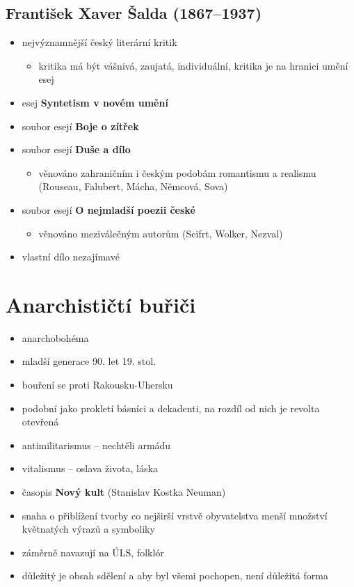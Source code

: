 \subsection{František Xaver Šalda (1867--1937)}
\begin{itemize}
\item nejvýznamnější český literární kritik
	\begin{itemize}
	\item kritika má být vášnivá, zaujatá, individuální, kritika je na hranici umění \ra esej
	\end{itemize}

\item esej \textbf{Syntetism v novém umění}
\item soubor esejí \textbf{Boje o zítřek}
\item soubor esejí \textbf{Duše a dílo}
	\begin{itemize}
	\item věnováno zahraničním i českým podobám romantismu a realismu (Rouseau, Falubert, Mácha, Němcová, Sova)
	\end{itemize}
\item soubor esejí \textbf{O nejmladší poezii české}
	\begin{itemize}
	\item věnováno meziválečným autorům (Seifrt, Wolker, Nezval)
	\end{itemize}
\item vlastní dílo nezajímavé
\end{itemize}


\section{Anarchističtí buřiči}
\begin{itemize}
\item anarchobohéma
\item mladší generace 90. let 19. stol.
\item bouření se proti Rakousku-Uhersku 
\item podobní jako prokletí básníci a dekadenti, na rozdíl od nich je revolta otevřená
\item antimilitarismus -- nechtěli armádu
\item vitalismus -- oslava života, láska
\item časopis \textbf{Nový kult} (Stanislav Kostka Neuman)
\item snaha o přiblížení tvorby co nejširší vrstvě obyvatelstva \ra menší množství květnatých výrazů a symboliky
\item záměrně navazují na ÚLS, folklór
\item důležitý je obsah sdělení a aby byl všemi pochopen, není důležitá forma 
\end{itemize}

